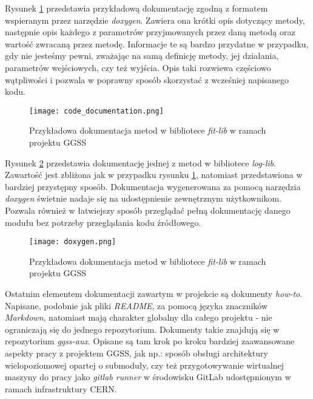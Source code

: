 Rysunek \ref{fig:code_documentation} przedstawia przykładową dokumentację zgodną z formatem wspieranym przez narzędzie \emph{doxygen}. Zawiera ona krótki opis dotyczący metody, następnie opis każdego z parametrów przyjmowanych przez daną metodą oraz wartość zwracaną przez metodę. Informacje te są bardzo przydatne w przypadku, gdy nie jesteśmy pewni, zważając na samą definicję metody, jej działania, parametrów wejściowych, czy też wyjścia. Opis taki rozwiewa częściowo wątpliwości i pozwala w poprawny sposób skorzystać z wcześniej napisanego kodu.
\begin{figure}[H]
    \centering
    \texttt{[image: code\_documentation.png]}
    \caption{Przykładowa dokumentacja metod w bibliotece \emph{fit-lib} w ramach projektu GGSS}
    \label{fig:code_documentation}
\end{figure} %

Rysunek \ref{fig:doxygen} przedstawia dokumentację jednej z metod w bibliotece \emph{log-lib}. Zawartość jest zbliżona jak w przypadku rysunku \ref{fig:code_documentation}, natomiast przedstawiona w bardziej przystępny sposób. Dokumentacja wygenerowana za pomocą narzędzia \emph{doxygen} świetnie nadaje się na udostępnienie zewnętrznym użytkownikom. Pozwala również w łatwiejszy sposób przeglądać pełną dokumentację danego modułu bez potrzeby przeglądania kodu źródłowego.

\begin{figure}[H]
    \centering
    \texttt{[image: doxygen.png]}
    \caption{Przykładowa dokumentacja metod w bibliotece \emph{fit-lib} w ramach projektu GGSS}
    \label{fig:doxygen}
\end{figure}

Ostatnim elementem dokumentacji zawartym w projekcie są dokumenty \emph{how-to}. Napisane, podobnie jak pliki \emph{README}, za pomocą języka znaczników \emph{Markdown}, natomiast mają charakter globalny dla całego projektu - nie ograniczają się do jednego repozytorium. Dokumenty takie znajdują się w repozytorium \emph{ggss-aux}. Opisane są tam krok po kroku bardziej zaawansowane aspekty pracy z projektem GGSS, jak np.: sposób obsługi architektury wielopoziomowej opartej o submoduły, czy też przygotowywanie wirtualnej maszyny do pracy jako \emph{gitlab runner} w środowisku GitLab udostępnionym w ramach infrastruktury CERN.

